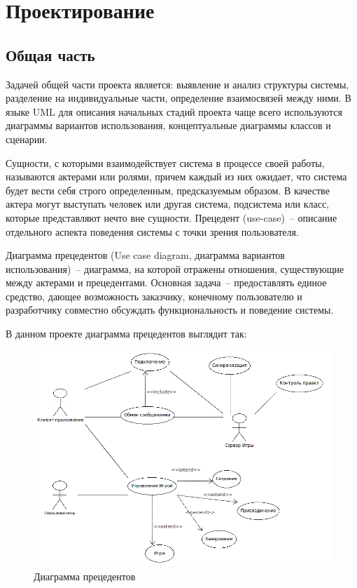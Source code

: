 ﻿\section{Проектирование}
\subsection{Общая часть}
Задачей общей части проекта является: выявление и анализ структуры системы, разделение на индивидуальные части, определение взаимосвязей между ними. В языке UML для описания начальных стадий проекта чаще всего используются диаграммы вариантов использования, концептуальные диаграммы классов и сценарии. 

Сущности, с которыми взаимодействует система в процессе своей работы, называются актерами или ролями, причем каждый из них ожидает, 
что система будет вести себя строго определенным, предсказуемым образом. В качестве актера могут выступать человек или 
другая система, подсистема или класс, которые представляют нечто вне сущности.
Прецедент (use-case)~-- описание отдельного аспекта поведения системы с точки зрения пользователя.

Диаграмма прецедентов (Use case diagram, диаграмма вариантов использования)~-- диаграмма, на которой отражены отношения, 
существующие между актерами и прецедентами.
Основная задача~-- предоставлять единое средство, дающее возможность заказчику, конечному пользователю и разработчику совместно
обсуждать функциональность и поведение системы.

В данном проекте диаграмма прецедентов выглядит так:

\begin{figure}[ht]
\centering
\includegraphics[width=18cm]{images/use.png}
\caption{Диаграмма прецедентов}
\label{fig0}
\end{figure}

